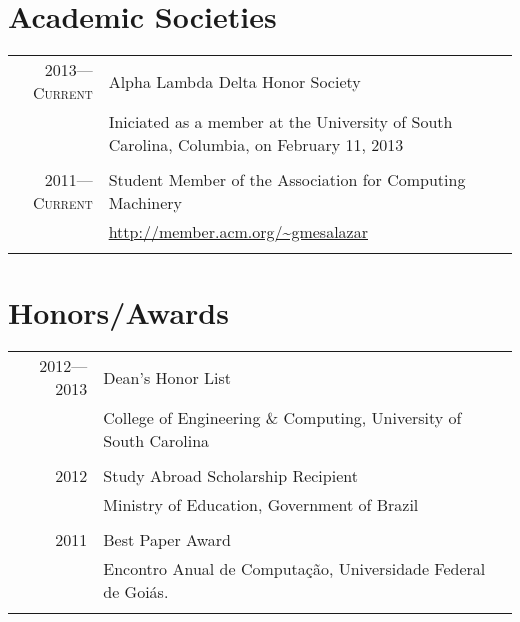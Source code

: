 \documentclass[a4paper,10pt]{article}
\begin{document}
\section{Academic Societies}

\begin{tabular}{r|p{11cm}}

  \textsc{2013---Current}
  & Alpha Lambda Delta Honor Society\\
  & \footnotesize{Iniciated as a member at the University of South Carolina, Columbia, on February 11, 2013}\\
  \multicolumn{2}{c}{}\\

  \textsc{2011---Current}
  & Student Member of the Association for Computing Machinery\\
  & \footnotesize{\url{http://member.acm.org/~gmesalazar}}
  \\\multicolumn{2}{c}{}\\
  
\end{tabular}

\section{Honors/Awards}
\begin{tabular}{r|p{11cm}}

  \textsc{2012---2013}
  & Dean's Honor List\\
  & College of Engineering \& Computing, University of South Carolina\\
  \multicolumn{2}{c}{}\\

  \textsc{2012}
  & Study Abroad Scholarship Recipient\\
  & Ministry of Education, Government of Brazil\\
  \multicolumn{2}{c}{}\\

  \textsc{2011}
  & Best Paper Award\\
  & Encontro Anual de Computação, Universidade Federal de Goiás.\\
  \multicolumn{2}{c}{}\\

\end{tabular}
\end{document}
